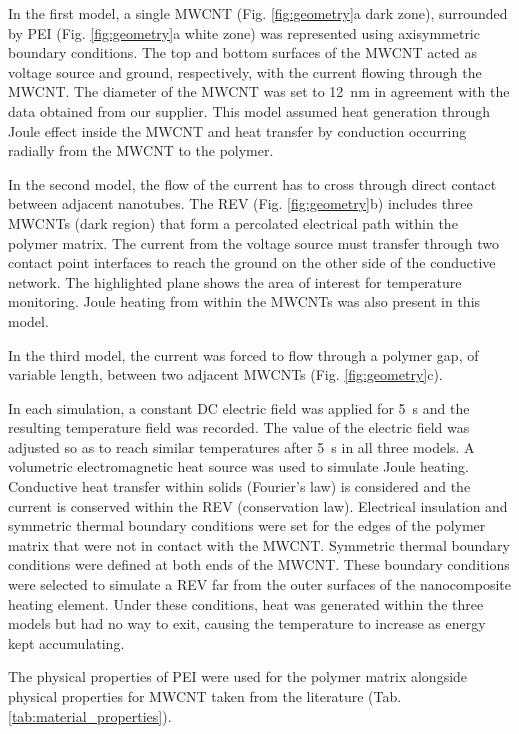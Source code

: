 \FloatBarrier

In the first model, a single MWCNT (Fig. \ref{fig:geometry}a dark zone), surrounded by PEI (Fig. \ref{fig:geometry}a white zone) was represented using axisymmetric boundary conditions. 
The top and bottom surfaces of the MWCNT acted as voltage source and ground, respectively, with the current flowing through the MWCNT. 
The diameter of the MWCNT was set to \SI{12}{\nano\metre} in agreement with the data obtained from our supplier. 
This model assumed heat generation through Joule effect inside the MWCNT and heat transfer by conduction occurring radially from the MWCNT to the polymer.

In the second model, the flow of the current has to cross through direct contact between adjacent nanotubes. 
The REV (Fig. \ref{fig:geometry}b) includes three MWCNTs (dark region) that form a percolated electrical path within the polymer matrix. 
The current from the voltage source must transfer through two contact point interfaces to reach the ground on the other side of the conductive network. 
The highlighted plane shows the area of interest for temperature monitoring. 
Joule heating from within the MWCNTs was also present in this model. 

In the third model, the current was forced to flow through a polymer gap, of variable length, between two adjacent MWCNTs (Fig. \ref{fig:geometry}c). 

In each simulation, a constant DC electric field was applied for \SI{5}{\second} and the resulting temperature field was recorded. 
The value of the electric field was adjusted so as to reach similar temperatures after \SI{5}{\second} in all three models. 
A volumetric electromagnetic heat source was used to simulate Joule heating. 
Conductive heat transfer within solids (Fourier's law) is considered and the current is conserved within the REV (conservation law). 
Electrical insulation and symmetric thermal boundary conditions were set for the edges of the polymer matrix that were not in contact with the MWCNT. 
Symmetric thermal boundary conditions were defined at both ends of the MWCNT. 
These boundary conditions were selected to simulate a REV far from the outer surfaces of the nanocomposite heating element. 
Under these conditions, heat was generated within the three models but had no way to exit, causing the temperature to increase as energy kept accumulating.

The physical properties of PEI were used for the polymer matrix alongside physical properties for MWCNT taken from the literature (Tab. \ref{tab:material_properties}). 

